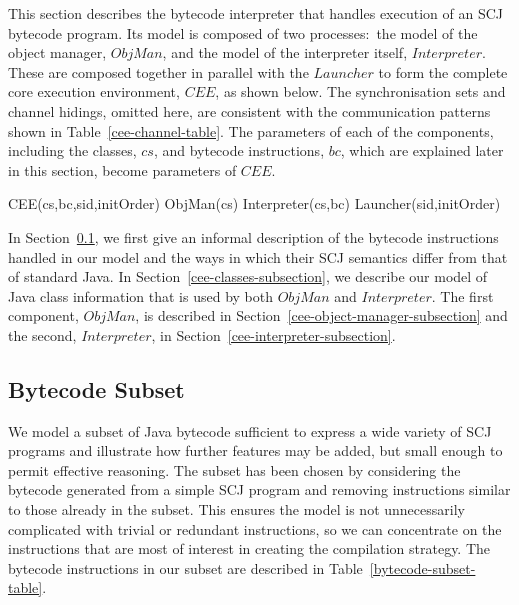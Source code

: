 This section describes the bytecode interpreter that handles execution
of an SCJ bytecode program.
Its model is composed of two processes:~the model of the object
manager, $ObjMan$, and the model of the interpreter itself,
$Interpreter$.
These are composed together in parallel with the $Launcher$ to form
the complete core execution environment, $CEE$, as shown below.
The synchronisation sets and channel hidings, omitted here, are
consistent with the communication patterns shown in
Table~\ref{cee-channel-table}.
The parameters of each of the components, including the classes, $cs$,
and bytecode instructions, $bc$, which are explained later in this
section, become parameters of $CEE$.
\begin{circus}
  CEE(cs,bc,sid,initOrder) \circdef ObjMan(cs) \parallel
  Interpreter(cs,bc) \parallel Launcher(sid,initOrder)
\end{circus}

In Section~\ref{cee-bytecode-subset-subsection}, we first give an
informal description of the bytecode instructions handled in our model
and the ways in which their SCJ semantics differ from that of standard
Java.
In Section~\ref{cee-classes-subsection}, we describe our model of Java
class information that is used by both $ObjMan$ and $Interpreter$.
The first component, $ObjMan$, is described in
Section~\ref{cee-object-manager-subsection} and the second,
$Interpreter$, in Section~\ref{cee-interpreter-subsection}.

\subsection{Bytecode Subset}
\label{cee-bytecode-subset-subsection}

We model a subset of Java bytecode sufficient to express a wide
variety of SCJ programs and illustrate how further features may be
added, but small enough to permit effective reasoning.
The subset has been chosen by considering the bytecode generated from
a simple SCJ program and removing instructions similar to those
already in the subset.
This ensures the model is not unnecessarily complicated with trivial
or redundant instructions, so we can concentrate on the instructions
that are most of interest in creating the compilation strategy.
The bytecode instructions in our subset are described in
Table~\ref{bytecode-subset-table}.

